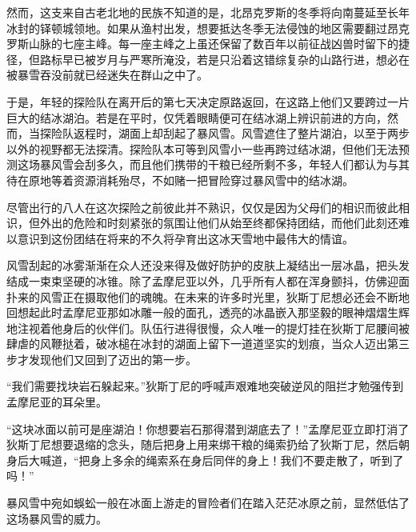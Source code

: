 然而，这支来自古老北地的民族不知道的是，北昂克罗斯的冬季将向南蔓延至长年冰封的铎顿城领地。如果从渔村出发，想要抵达冬季无法侵蚀的地区需要翻过昂克罗斯山脉的七座主峰。每一座主峰之上虽还保留了数百年以前征战凶兽时留下的捷径，但路标早已被岁月与严寒所淹没，若是只沿着这错综复杂的山路行进，想必在被暴雪吞没前就已经迷失在群山之中了。

于是，年轻的探险队在离开后的第七天决定原路返回，在这路上他们又要跨过一片巨大的结冰湖泊。若是在平时，仅凭着眼睛便可在结冰湖上辨识前进的方向，然而，当探险队返程时，湖面上却刮起了暴风雪。风雪遮住了整片湖泊，以至于两步以外的视野都无法探清。探险队本可等到风雪小一些再跨过结冰湖，但他们无法预测这场暴风雪会刮多久，而且他们携带的干粮已经所剩不多，年轻人们都认为与其待在原地等着资源消耗殆尽，不如赌一把冒险穿过暴风雪中的结冰湖。

尽管出行的八人在这次探险之前彼此并不熟识，仅仅是因为父母们的相识而彼此相识，但外出的危险和时刻紧张的氛围让他们从始至终都保持团结，而他们此刻还难以意识到这份团结在将来的不久将孕育出这冰天雪地中最伟大的情谊。

风雪刮起的冰雾渐渐在众人还没来得及做好防护的皮肤上凝结出一层冰晶，把头发结成一束束坚硬的冰锥。除了孟摩尼亚以外，几乎所有人都在浑身颤抖，仿佛迎面扑来的风雪正在摄取他们的魂魄。在未来的许多时光里，狄斯丁尼想必还会不断地回想起此时孟摩尼亚那如冰雕一般的面孔，透亮的冰晶嵌入那坚毅的眼神熠熠生辉地注视着他身后的伙伴们。队伍行进得很慢，众人唯一的提灯挂在狄斯丁尼腰间被肆虐的风鞭挞着，破冰槌在冰封的湖面上留下一道道坚实的划痕，当众人迈出第三步才发现他们又回到了迈出的第一步。

“我们需要找块岩石躲起来。”狄斯丁尼的呼喊声艰难地突破逆风的阻拦才勉强传到孟摩尼亚的耳朵里。

“这块冰面以前可是座湖泊！你想要岩石那得潜到湖底去了！”孟摩尼亚立即打消了狄斯丁尼想要退缩的念头，随后把身上用来绑干粮的绳索扔给了狄斯丁尼，然后朝身后大喊道，“把身上多余的绳索系在身后同伴的身上！我们不要走散了，听到了吗！”

暴风雪中宛如蜈蚣一般在冰面上游走的冒险者们在踏入茫茫冰原之前，显然低估了这场暴风雪的威力。